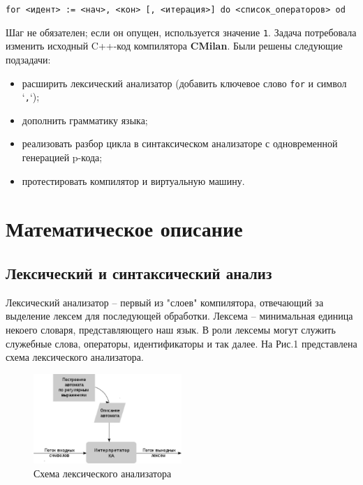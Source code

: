 \documentclass[areasetadvanced]{scrartcl}
\begin{document}
    \begin{center}
    \verb|for <идент> := <нач>, <кон> [, <итерация>] do <список_операторов> od|
    \end{center}
    
    Шаг не обязателен; если он опущен, используется значение \texttt{1}.  
    Задача потребовала изменить исходный C++-код компилятора \textbf{CMilan}.
    Были решены следующие подзадачи:
    \begin{itemize}
      \item расширить лексический анализатор (добавить ключевое слово
            \verb|for| и символ `\verb|,|`);
      \item дополнить грамматику языка;
      \item реализовать разбор цикла в синтаксическом анализаторе
            с одновременной генерацией p-кода;
      \item протестировать компилятор и виртуальную машину.
    \end{itemize}

    \newpage
    \section{Математическое описание}
    \subsection{Лексический и синтаксический анализ}
    Лексический анализатор – первый из "слоев" компилятора, отвечающий за выделение лексем для последующей обработки. Лексема – минимальная единица некоего словаря, представляющего наш язык. В роли лексемы могут служить служебные слова, операторы, идентификаторы и так далее. На Рис.1 представлена схема лексического анализатора. 

    \begin{figure}[H]
        \centering
        \includegraphics[width=0.5\textwidth]{schema.png}
        \caption{Схема лексического анализатора}
    \end{figure}
\end{document}
